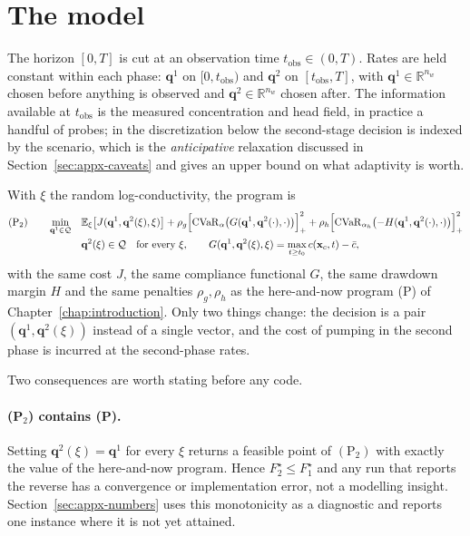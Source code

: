 \documentclass[11pt]{article}
\newcommand{\E}{\mathbb{E}}
\newcommand{\xx}{\mathbf{x}}
\newcommand{\qq}{\mathbf{q}}
\newcommand{\CVaR}{\operatorname{CVaR}}
\newcommand{\calQ}{\mathcal{Q}}
\begin{document}
\section{The model}
\label{sec:appx-model}

The horizon $[0,T]$ is cut at an observation time $t_{\mathrm{obs}}\in(0,T)$.
Rates are held constant within each phase: $\qq^{1}$ on $[0,t_{\mathrm{obs}})$
and $\qq^{2}$ on $[t_{\mathrm{obs}},T]$, with $\qq^{1}\in\mathbb{R}^{n_w}$ chosen
before anything is observed and $\qq^{2}\in\mathbb{R}^{n_w}$ chosen after. The
information available at $t_{\mathrm{obs}}$ is the measured concentration and
head field, in practice a handful of probes; in the discretization below the
second-stage decision is indexed by the scenario, which is the
\emph{anticipative} relaxation discussed in Section~\ref{sec:appx-caveats} and
gives an upper bound on what adaptivity is worth.

With $\xi$ the random log-conductivity, the program is
\begin{equation}
\begin{aligned}
(\mathrm{P}_2)\qquad
\min_{\qq^{1}\in\calQ}\quad
& \E_{\xi}\bigl[J(\qq^{1},\qq^{2}(\xi),\xi)\bigr]
  +\rho_g\Bigl[\CVaR_{\alpha}\bigl(G(\qq^{1},\qq^{2}(\cdot),\cdot)\bigr)\Bigr]_+^{2}
  +\rho_h\Bigl[\CVaR_{\alpha_h}\bigl(-H(\qq^{1},\qq^{2}(\cdot),\cdot)\bigr)\Bigr]_+^{2}
\\
& \qq^{2}(\xi)\in\calQ \quad\text{for every }\xi,
\qquad
G(\qq^{1},\qq^{2}(\xi),\xi)=\max_{t\ge t_0}c(\xx_c,t)-\bar c,
\end{aligned}
\label{eq:appx-p2}
\end{equation}
with the same cost $J$, the same compliance functional $G$, the same drawdown
margin $H$ and the same penalties $\rho_g,\rho_h$ as the here-and-now program
(P) of Chapter~\ref{chap:introduction}. Only two things change: the decision is a
pair $(\qq^{1},\qq^{2}(\xi))$ instead of a single vector, and the cost of pumping
in the second phase is incurred at the second-phase rates.

Two consequences are worth stating before any code.

\paragraph{(P$_2$) contains (P).} Setting $\qq^{2}(\xi)=\qq^{1}$ for every $\xi$
returns a feasible point of $(\mathrm{P}_2)$ with exactly the value of the
here-and-now program. Hence $F_2^\star\le F_1^\star$ and any run that reports
the reverse has a convergence or implementation error, not a modelling insight.
Section~\ref{sec:appx-numbers} uses this monotonicity as a diagnostic and reports
one instance where it is not yet attained.
\end{document}
